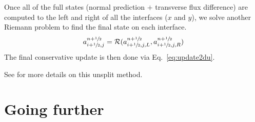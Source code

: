 Once all of the full states (normal prediction $+$ transverse flux
difference) are computed to the left and right of all the interfaces
($x$ and $y$), we solve another Riemann problem to find the final 
state on each interface.
\begin{equation}
a_{i+\sfrac{1}{2},j}^{n+\sfrac{1}{2}} = \mathcal{R}(a_{i+\sfrac{1}{2},j,L}^{n+\sfrac{1}{2}},
                                  a_{i+\sfrac{1}{2},j,R}^{n+\sfrac{1}{2}}) \\
\end{equation}
The final conservative update is then done via Eq.~\ref{eq:update2du}.

See \cite{colella:1990} for more details on this unsplit method.



\section{Going further}


